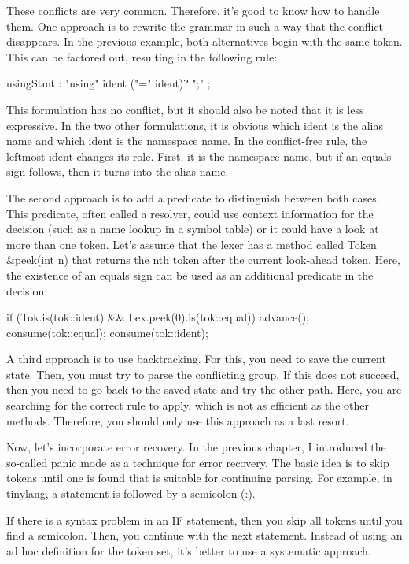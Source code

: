 These conflicts are very common. Therefore, it’s good to know how to handle them. One approach is to rewrite the grammar in such a way that the conflict disappears. In the previous example, both alternatives begin with the same token. This can be factored out, resulting in the following rule:

\begin{shell}
usingStmt : "using" ident ("=" ident)? ";" ;
\end{shell}

This formulation has no conflict, but it should also be noted that it is less expressive. In the two other formulations, it is obvious which ident is the alias name and which ident is the namespace name. In the conflict-free rule, the leftmost ident changes its role. First, it is the namespace name, but if an equals sign follows, then it turns into the alias name.

The second approach is to add a predicate to distinguish between both cases. This predicate, often called a resolver, could use context information for the decision (such as a name lookup in a symbol table) or it could have a look at more than one token. Let’s assume that the lexer has a method called Token \&peek(int n) that returns the nth token after the current look-ahead token. Here, the existence of an equals sign can be used as an additional predicate in the decision:


\begin{cpp}
if (Tok.is(tok::ident) && Lex.peek(0).is(tok::equal)) {
    advance();
    consume(tok::equal);
}
consume(tok::ident);
\end{cpp}

A third approach is to use backtracking. For this, you need to save the current state. Then, you must try to parse the conflicting group. If this does not succeed, then you need to go back to the saved state and try the other path. Here, you are searching for the correct rule to apply, which is not as efficient as the other methods. Therefore, you should only use this approach as a last resort.

Now, let’s incorporate error recovery. In the previous chapter, I introduced the so-called panic mode as a technique for error recovery. The basic idea is to skip tokens until one is found that is suitable for continuing parsing. For example, in tinylang, a statement is followed by a semicolon (:).

If there is a syntax problem in an IF statement, then you skip all tokens until you find a semicolon. Then, you continue with the next statement. Instead of using an ad hoc definition for the token set, it’s better to use a systematic approach.

